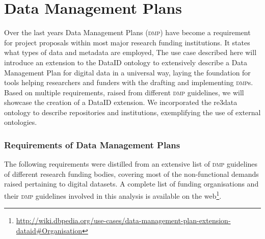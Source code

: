 \documentclass[runningheads,a4paper]{llncs}
\newcommand{\dmp}{{\scshape dmp}\xspace}
\newcommand\footnoteurl[1]{\footnote{\scriptsize\url{#1}}}
\begin{document}
\section{Data Management Plans}
\label{dmps}
Over the last years Data Management Plans (\dmp) have become a requirement for project proposals within most major research funding institutions. It states what types of data and metadata are employed,%
The use case described here will introduce an extension to the DataID ontology to extensively describe a Data Management Plan for digital data in a universal way, laying the foundation for tools helping researchers and funders with the drafting and implementing \dmp{}s. %
Based on multiple requirements, raised from different \dmp guidelines, we will showcase the creation of a DataID extension. We incorporated the re3data ontology to describe repositories and institutions, exemplifying the use of external ontologies.

\subsubsection{Requirements of Data Management Plans}
\label{requDmp}
The following requirements were distilled from an extensive list of \dmp guidelines of different research funding bodies,
covering most of the non-functional demands raised pertaining to digital datasets. A complete list of funding organisations and their \dmp guidelines involved in this analysis is available on the web\footnoteurl{http://wiki.dbpedia.org/use-cases/data-management-plan-extension-dataid\#Organisation}. %
\end{document}
